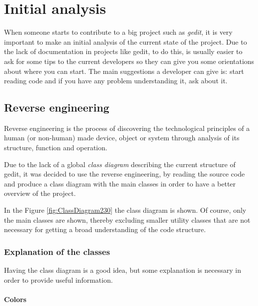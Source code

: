 
\chapter{Initial analysis}\label{chap:InitialAnalysis}


When someone starts to contribute to a big project such as \emph{gedit}, it is very important to make an initial analysis of the current state of the project. Due to the lack of documentation in projects like gedit, to do this, is usually easier to ask for some tips to the current developers so they can give you some orientations about where you can start. The main suggestions a developer can give is: start reading code and if you have any problem understanding it, ask about it.

\section{Reverse engineering}\label{ReverseEngineering}

Reverse engineering is the process of discovering the technological principles of a human (or non-human) made device, object or system through analysis of its structure, function and operation.\cite{website:reverse-engineer}

Due to the lack of a global \emph{class diagram} describing the current structure of gedit, it was decided to use the reverse engineering, by reading the source code and produce a class diagram with the main classes in order to have a better overview of the project.

In the Figure \ref{fig:ClassDiagram230} the class diagram is shown. Of course,  only the main classes are shown, thereby excluding smaller utility classes that are not necessary for getting a broad understanding of the code structure. 

\newpage
{}

\subsection{Explanation of the classes}

Having the class diagram is a good idea, but some explanation is necessary in order to provide useful information.

\subsubsection{Colors}

